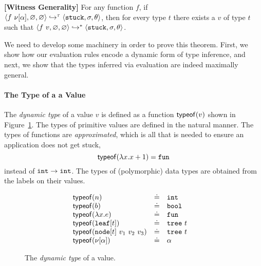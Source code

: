 \begin{thm}{\textbf{[Witness Generality]}}
\label{thm:soundness}
  For any function $f$, if\\
  \hbox{$\langle f\ \nu[\alpha], \varnothing, \varnothing \rangle \hookrightarrow^{\tau} \langle \mathtt{stuck}, \sigma, \theta \rangle$,}
  then for every %
  type
  $t$ there exists a $v$ of type $t$ such that
  $\langle f\ v, \varnothing, \varnothing \rangle \hookrightarrow^{*} \langle \mathtt{stuck}, \sigma, \theta \rangle{}$.
\end{thm}

We need to develop some machinery in order to prove this theorem.
First, we show how our evaluation rules encode a dynamic form of
type inference, and next, we show that the types inferred via
evaluation are indeed maximally general.

\paragraph{The Type of a a Value} The \emph{dynamic type}
of a value $v$ is defined as a function $\mathsf{typeof}(v)$ shown
in Figure~\ref{fig:typeof}.
%
The types of primitive values are defined in the natural manner.
%
The types of functions are \emph{approximated}, which is all
that is needed to ensure an application does not get stuck, \eg
$$\mathsf{typeof}(\lambda x. x + 1) = \mathtt{fun}$$
instead of $\mathtt{int} \rightarrow \mathtt{int}$.
%
The types of (polymorphic) data types are obtained from the
labels on their values.

\begin{figure}[ht]
\[ \begin{array}{lcll}
    \mathsf{typeof}(n)   & \doteq & \mathtt{int} & \\
    \mathsf{typeof}(b)   & \doteq & \mathtt{bool} & \\
    \mathsf{typeof}(\lambda x. e) & \doteq & \mathtt{fun} \\
    \mathsf{typeof}(\mathtt{leaf}[t]) & \doteq & \mathtt{tree}\ t \\
    \mathsf{typeof}(\mathtt{node}[t]\ v_1\ v_2\ v_3) & \doteq & \mathtt{tree}\ t \\
    \mathsf{typeof}(\nu[\alpha]) & \doteq & \alpha \\
  \end{array} \]
\caption{The \emph{dynamic type} of a value.}
\label{fig:typeof}
\end{figure}

